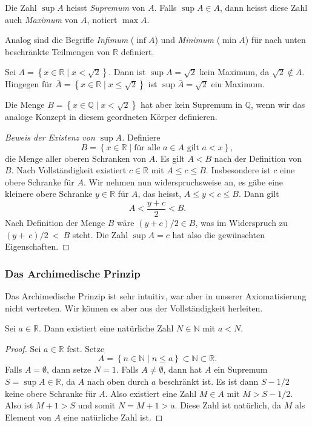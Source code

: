 \documentclass[../main.tex]{subfiles}
\begin{document}
Die Zahl $\sup A$ heisst \emph{Supremum} von $A$. Falls
$\sup A \in A$, dann heisst diese Zahl auch \emph{Maximum} von $A$,
notiert $\max A$.

Analog sind die Begriffe \emph{Infimum} ($\inf A$) und
\emph{Minimum} ($\min A$) für nach unten beschränkte
Teilmengen von $\mathbb{R}$ definiert.
 
\begin{example}
  Sei $A = \left\{x \in \mathbb{R} \mid x < \sqrt 2\right\}$.
  Dann ist $\sup A = \sqrt 2$ kein Maximum, da $\sqrt 2 \notin A$.
  Hingegen für 
  $\bar A = \left\{x \in \mathbb{R} \mid x \leq \sqrt 2\right\}$
  ist $\sup \bar A = \sqrt 2$ ein Maximum.

  Die Menge $B = \left\{x \in \mathbb{Q} \mid x < \sqrt 2\right\}$
  hat aber kein Supremum in $\mathbb{Q}$, wenn wir das analoge
  Konzept in diesem 
  geordneten Körper definieren. 
\end{example}

\begin{proof}[Beweis der Existenz von $\sup A$]
  Definiere
  \[
	  B = \left\{x \in \mathbb{R} \mid \text{für alle } a \in A
  \text{ gilt } a < x\right\},
  \]
  die Menge aller oberen Schranken von $A$. Es gilt $A < B$
  nach der Definition von $B$.
  Nach Vollständigkeit existiert $c \in \mathbb{R}$
  mit $A \leq c \leq B$.
  Insbesondere ist $c$ eine obere Schranke für $A$.
  Wir nehmen nun widerspruchsweise an, es gäbe eine
  kleinere obere Schranke $y \in \mathbb{R}$ für $A$,
  das heisst, $A \leq y < c \leq B$.
  Dann gilt
  \[
    A < \frac{y + c}{2} < B.
  \]
  Nach Definition der Menge $B$ wäre
  $(y + c)/2 \in B$, was im Widerspruch zu $(y +~c)/2~<~B$ steht.
  Die Zahl $\sup A = c$ hat also die gewünschten Eigenschaften.
\end{proof}

\subsubsection*{Das Archimedische Prinzip}
Das Archimedische Prinzip ist sehr intuitiv, war aber in
unserer Axiomatisierung nicht vertreten. Wir können
es aber aus der Vollständigkeit herleiten.

\begin{archimedes}
  Sei $a \in \mathbb{R}$. Dann existiert eine natürliche
  Zahl $N \in \mathbb{N}$ mit $a < N$.
\end{archimedes}

\begin{proof}
  Sei $a \in \mathbb{R}$ fest. Setze
  \[
    A = \left\{n \in \mathbb{N} \mid n \leq a\right\} \subset \mathbb{N}
    \subset \mathbb{R}.
  \]
  Falls $A = \emptyset$, dann setze $N = 1$.
  Falls $A \neq \emptyset$, dann hat $A$ ein Supremum
  $S = \sup A \in \mathbb{R}$, da $A$ nach oben 
  durch $a$ beschränkt ist.
  Es ist dann $S - 1/2$ keine obere Schranke für $A$. 
  Also existiert eine Zahl $M \in A$ mit $M > S - 1/2$.
  Also ist $M + 1 > S$ und somit $N = M + 1 > a$. Diese Zahl ist
  natürlich, da $M$ als Element von $A$ eine natürliche Zahl ist.
\end{proof}
\end{document}
